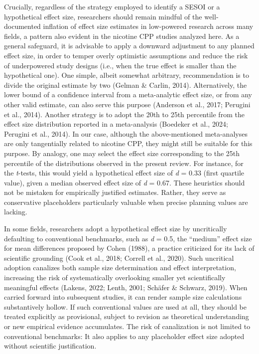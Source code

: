 \documentclass[authordate, meta, issue]{jote-new-article}
\begin{document}
	Crucially, regardless of the strategy employed to identify a SESOI or a hypothetical effect size, researchers should remain mindful of the well-documented inflation of effect size estimates in low-powered research across many fields, a pattern also evident in the nicotine CPP studies analyzed here. As a general safeguard, it is advisable to apply a downward adjustment to any planned effect size, in order to temper overly optimistic assumptions and reduce the risk of underpowered study designs (i.e., when the true effect is smaller than the hypothetical one). One simple, albeit somewhat arbitrary, recommendation is to divide the original estimate by two (Gelman \& Carlin, 2014). Alternatively, the lower bound of a confidence interval from a meta-analytic effect size, or from any other valid estimate, can also serve this purpose (Anderson et al., 2017; Perugini et al., 2014). Another strategy is to adopt the 20th to 25th percentile from the effect size distribution reported in a meta-analysis (Boedeker et al., 2024; Perugini et al., 2014). In our case, although the above-mentioned meta-analyses are only tangentially related to nicotine CPP, they might still be suitable for this purpose. By analogy, one may select the effect size corresponding to the 25th percentile of the distributions observed in the present review. For instance, for the \emph{t}-tests, this would yield a hypothetical effect size of \emph{d} = 0.33 (first quartile value), given a median observed effect size of \emph{d} = 0.67. These heuristics should not be mistaken for empirically justified estimates. Rather, they serve as conservative placeholders particularly valuable when precise planning values are lacking.



	In some fields, researchers adopt a hypothetical effect size by uncritically defaulting to conventional benchmarks, such as \emph{d} = 0.5, the “medium” effect size for mean differences proposed by Cohen (1988), a practice criticized for its lack of scientific grounding (Cook et al., 2018; Correll et al., 2020). Such uncritical adoption canalizes both sample size determination and effect interpretation, increasing the risk of systematically overlooking smaller yet scientifically meaningful effects (Lakens, 2022; Lenth, 2001; Schäfer \& Schwarz, 2019). When carried forward into subsequent studies, it can render sample size calculations substantively hollow. If such conventional values are used at all, they should be treated explicitly as provisional, subject to revision as theoretical understanding or new empirical evidence accumulates. The risk of canalization is not limited to conventional benchmarks: It also applies to any placeholder effect size adopted without scientific justification.
\end{document}
